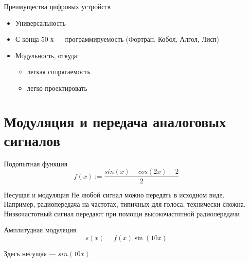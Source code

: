 \documentclass[xetex,aspectratio=43]{beamer}
\begin{document}
\begin{frame}{Преимущества цифровых устройств}
	\begin{itemize}

		\item
		Универсальность
		\item
		С конца 50-х --- программируемость (Фортран, Кобол, Алгол, Лисп)
		\item
		Модульность, откуда:

		\begin{itemize}

			\item
			легкая сопрягаемость
			\item
			легко проектировать
		\end{itemize}
	\end{itemize}
\end{frame}

\section{Модуляция и передача аналоговых сигналов}

\begin{frame}{Подопытная функция}
	\[f(x) := \frac{sin(x) +cos(2x) +2}{2}\]

	\begin{center}
		
	\end{center}
\end{frame}

\begin{frame}{Несущая и модуляция}
	Не любой сигнал можно передать в исходном виде. Например, радиопередача
	на частотах, типичных для голоса, технически сложна. Низкочастотный
	сигнал передают при помощи высокочастотной радиопередачи

	\pause


\end{frame}

\begin{frame}{Амплитудная модуляция}
	\[s(x) = f(x)\sin(10 x)\]

	\begin{center}
		
	\end{center}

	Здесь несущая --- \(sin(10 x)\)
\end{frame}
\end{document}

